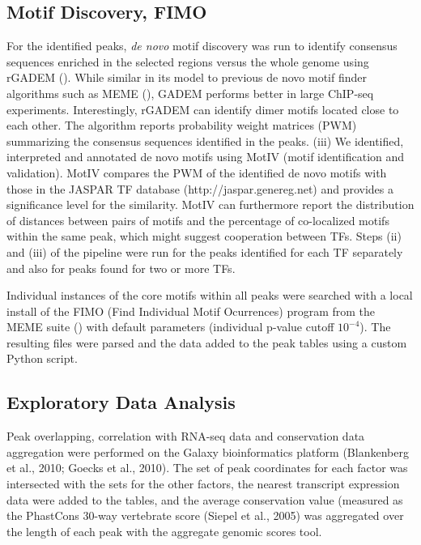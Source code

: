 \subsection{Motif Discovery, FIMO}

For the identified peaks, \textit{de novo} motif discovery was run to identify consensus sequences enriched in the selected regions versus the whole genome using rGADEM (\cite{Li2009a}). While similar in its model to previous de novo motif finder algorithms such as MEME (\cite{Bailey2006}), GADEM performs better in large ChIP-seq experiments. Interestingly, rGADEM can identify dimer motifs located close to each other. The algorithm reports probability weight matrices (PWM) summarizing the consensus sequences identified in the peaks. (iii) We identified, interpreted and annotated de novo motifs using MotIV (motif identification and validation). MotIV compares the PWM of the identified de novo motifs with those in the JASPAR TF database (http://jaspar.genereg.net) and provides a significance level for the similarity. MotIV can furthermore report the distribution of distances between pairs of motifs and the percentage of co-localized motifs within the same peak, which might suggest cooperation between TFs. Steps (ii) and (iii) of the pipeline were run for the peaks identified for each TF separately and also for peaks found for two or more TFs. 

Individual instances of the core motifs within all peaks were searched with a local install of the FIMO (Find Individual Motif Ocurrences) program from the MEME suite (\cite{Bailey2009}) with default parameters (individual p-value cutoff $10^{-4}$). The resulting files were parsed and the data added to the peak tables using a custom Python script. 


\subsection{Exploratory Data Analysis}


Peak overlapping, correlation with RNA-seq data and conservation data aggregation were performed on the Galaxy bioinformatics platform (Blankenberg et al., 2010; Goecks et al., 2010). The set of peak coordinates for each factor was intersected with the sets for the other factors, the nearest transcript expression data were added to the tables, and the average conservation value (measured as the PhastCons 30-way vertebrate score (Siepel et al., 2005) was aggregated over the length of each peak with the aggregate genomic scores tool.

